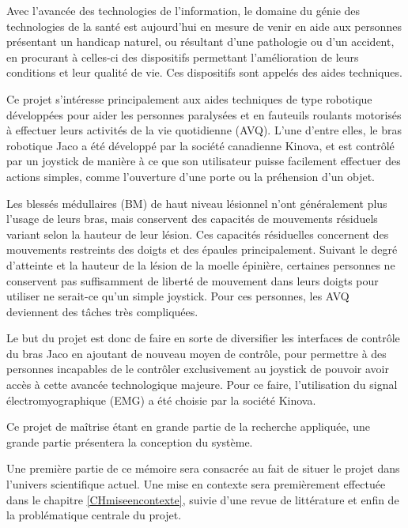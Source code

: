 \documentclass[letterpaper, twoside, 12pt, memoire, creativecommons, hyperref]{thETS}
\begin{document}
\reversemarginpar %

\begin{introduction}

Avec l’avancée des technologies de l’information, le domaine du génie des technologies de la santé est aujourd’hui en mesure de venir en aide aux personnes présentant un handicap naturel, ou résultant d’une pathologie ou d’un accident, en procurant à celles-ci des dispositifs permettant l’amélioration de leurs conditions et leur qualité de vie. Ces dispositifs sont appelés des aides techniques.

Ce projet s’intéresse principalement aux aides techniques de type robotique développées pour aider les personnes paralysées et en fauteuils roulants motorisés à effectuer leurs activités de la vie quotidienne (AVQ). L'une d'entre elles, le bras robotique Jaco a été développé par la société canadienne Kinova, et est contrôlé par un joystick de manière à ce que son utilisateur puisse facilement effectuer des actions simples, comme l’ouverture d’une porte ou la préhension d’un objet.

Les blessés médullaires (BM) de haut niveau lésionnel n’ont généralement plus l’usage de leurs bras, mais conservent des capacités de mouvements résiduels variant selon la hauteur de leur lésion. Ces capacités résiduelles concernent des mouvements restreints des doigts et des épaules principalement. Suivant le degré d’atteinte et la hauteur de la lésion de la moelle épinière, certaines personnes ne conservent pas suffisamment de liberté de mouvement dans leurs doigts pour utiliser ne serait-ce qu’un simple joystick. Pour ces personnes, les AVQ deviennent des tâches très compliquées.

Le but du projet est donc de faire en sorte de diversifier les interfaces de contrôle du bras Jaco en ajoutant de nouveau moyen de contrôle, pour permettre à des personnes incapables de le contrôler exclusivement au joystick de pouvoir avoir accès à cette avancée technologique majeure. Pour ce faire, l'utilisation du signal électromyographique (EMG) a été choisie par la société Kinova.

Ce projet de maîtrise étant en grande partie de la recherche appliquée, une grande partie présentera la conception du système. 

Une première partie de ce mémoire sera consacrée au fait de situer le projet dans l'univers scientifique actuel. Une mise en contexte sera premièrement effectuée dans le chapitre \ref{CHmiseencontexte}, suivie d'une revue de littérature et enfin de la problématique centrale du projet.


\end{introduction}
\end{document}
